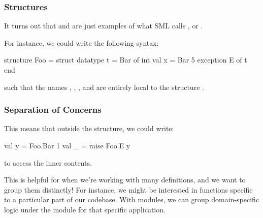 \documentclass[aspectratio=169]{beamer}
\begin{document}
\begin{frame}[fragile]
  \frametitle{Structures}

  It turns out that  and  are just examples of what SML
  calls , or .

  \pause
  \vspace{\fill}


  \pause
  \vspace{\fill}

  For instance, we could write the following syntax:
  \begin{codeblock}
    structure Foo =
      struct
        datatype t = Bar of int
        val x = Bar 5
        exception E of t
      end
  \end{codeblock}

  such that the names , , , and  are entirely
  local to the structure .

\end{frame}

\begin{frame}[fragile]
  \frametitle{Separation of Concerns}

  This means that outside the structure, we could write:

  \begin{codeblock}
    val y = Foo.Bar 1
    val _ = raise Foo.E y
  \end{codeblock}
  to access the inner contents.

  \pause
  \vspace{\fill}

  This is helpful for when we're working with many definitions, and we want to
  group them distinctly! For instance, we might be interested in functions specific
  to a particular part of our codebase. With modules, we can group domain-specific logic under the
  module for that specific application.

  \pause
  \vspace{\fill}

\end{frame}
\end{document}
